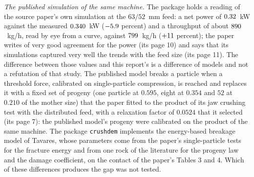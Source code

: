 \emph{The published simulation of the same machine.} The package holds a reading of the source paper's own simulation at the $63/52$~mm feed: a net power of $0.32$~kW against the measured $0.340$~kW ($-5.9$ percent) and a throughput of about $890$~kg/h, read by eye from a curve, against $799$~kg/h ($+11$ percent); the paper writes of very good agreement for the power (its page 10) and says that its simulations captured very well the trends with the feed size (its page 11). The difference between those values and this report's is a difference of models and not a refutation of that study. The published model breaks a particle when a threshold force, calibrated on single-particle compression, is reached and replaces it with a fixed set of progeny (one particle at $0.595$, eight at $0.354$ and $52$ at $0.210$ of the mother size) that the paper fitted to the product of its jaw crushing test with the distributed feed, with a relaxation factor of $0.0524$ that it selected (its page 7): the published model's progeny were calibrated on the product of the same machine. The package \texttt{crushdem} implements the energy-based breakage model of Tavares, whose parameters come from the paper's single-particle tests for the fracture energy and from one rock of the literature for the progeny law and the damage coefficient, on the contact of the paper's Tables 3 and 4. Which of these differences produces the gap was not tested.

